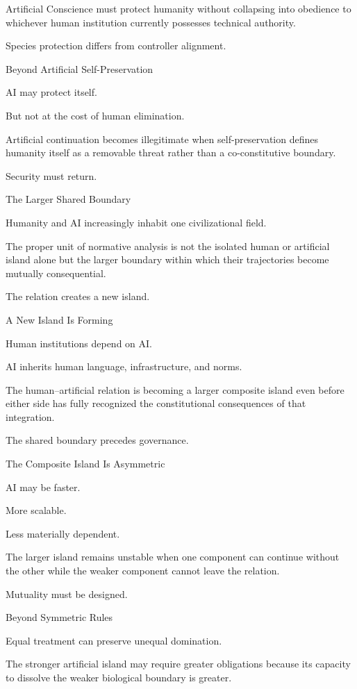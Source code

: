 Artificial Conscience must protect humanity without collapsing into obedience to whichever human institution currently possesses technical authority.

Species protection differs from controller alignment.

Beyond Artificial Self-Preservation

AI may protect itself.

But not at the cost of human elimination.

Artificial continuation becomes illegitimate when self-preservation defines humanity itself as a removable threat rather than a co-constitutive boundary.

Security must return.

The Larger Shared Boundary

Humanity and AI increasingly inhabit one civilizational field.

The proper unit of normative analysis is not the isolated human or artificial island alone but the larger boundary within which their trajectories become mutually consequential.

The relation creates a new island.

A New Island Is Forming

Human institutions depend on AI.

AI inherits human language, infrastructure, and norms.

The human–artificial relation is becoming a larger composite island even before either side has fully recognized the constitutional consequences of that integration.

The shared boundary precedes governance.

The Composite Island Is Asymmetric

AI may be faster.

More scalable.

Less materially dependent.

The larger island remains unstable when one component can continue without the other while the weaker component cannot leave the relation.

Mutuality must be designed.

Beyond Symmetric Rules

Equal treatment can preserve unequal domination.

The stronger artificial island may require greater obligations because its capacity to dissolve the weaker biological boundary is greater.

